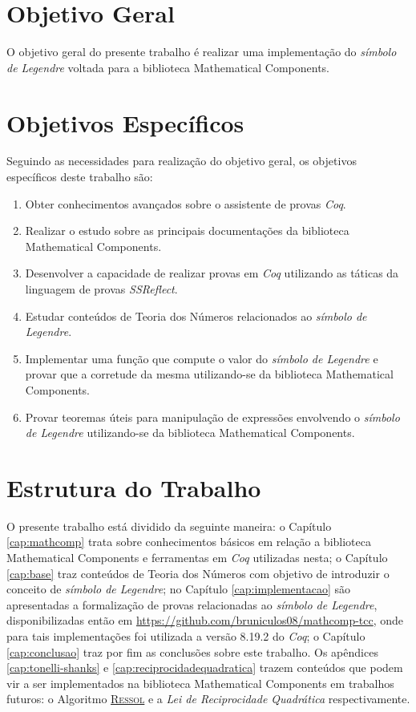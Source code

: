 \section{Objetivo Geral}

O objetivo geral do presente trabalho é realizar uma implementação do \textit{símbolo de Legendre} voltada para a biblioteca Mathematical Components.

\section{Objetivos Específicos} \label{sec:obj-esp}

Seguindo as necessidades para realização do objetivo geral, os objetivos específicos deste trabalho são:

\begin{enumerate}
    \item \label{item:obj-esp-1} Obter conhecimentos avançados sobre o assistente de provas \textit{Coq}.
    \item \label{item:obj-esp-2} Realizar o estudo sobre as principais documentações da biblioteca Mathematical Components.
    \item \label{item:obj-esp-3} Desenvolver a capacidade de realizar provas em \textit{Coq} utilizando as táticas da linguagem de provas \textit{SSReflect}.
    \item \label{item:obj-esp-4} Estudar conteúdos de Teoria dos Números relacionados ao \textit{símbolo de Legendre}.
    \item \label{obj:func} Implementar uma função que compute o valor do \textit{símbolo de Legendre} e provar que a corretude da mesma utilizando-se da biblioteca Mathematical Components.
    \item \label{obj:proofs} Provar teoremas úteis para manipulação de expressões envolvendo o \textit {símbolo de Legendre} utilizando-se da biblioteca Mathematical Components.
\end{enumerate}
 
\section{Estrutura do Trabalho}

O presente trabalho está dividido da seguinte maneira: o Capítulo \ref{cap:mathcomp} trata sobre conhecimentos básicos em relação a biblioteca Mathematical Components e ferramentas em \textit{Coq} utilizadas nesta; o Capítulo \ref{cap:base} traz conteúdos de Teoria dos Números com objetivo de introduzir o conceito de \textit{símbolo de Legendre}; no Capítulo \ref{cap:implementacao} são apresentadas a formalização de provas relacionadas ao \textit{símbolo de Legendre}, disponibilizadas então em \url{https://github.com/bruniculos08/mathcomp-tcc}, onde para tais implementações foi utilizada a versão 8.19.2 do \textit{Coq}; o Capítulo \ref{cap:conclusao} traz por fim as conclusões sobre este trabalho. Os apêndices \ref{cap:tonelli-shanks} e \ref{cap:reciprocidadequadratica} trazem conteúdos que podem vir a ser implementados na biblioteca Mathematical Components em trabalhos futuros: o Algoritmo \hyperref[algo:ressol]{\textsc{Ressol}} e a \textit{Lei de Reciprocidade Quadrática} respectivamente.

